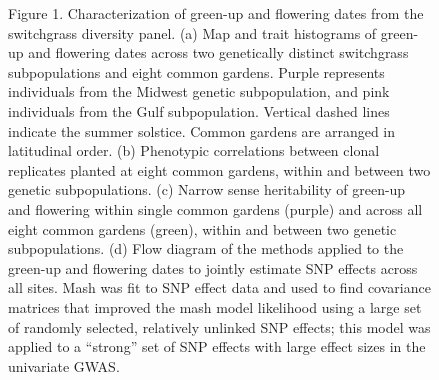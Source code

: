 \documentclass[
  9pt,
  twocolumn,
  twoside]{pnas-new}
\begin{document}
\begin{figure}


\caption{\label{fig-map}Figure 1. Characterization of green-up and
flowering dates from the switchgrass diversity panel. (a) Map and trait
histograms of green-up and flowering dates across two genetically
distinct switchgrass subpopulations and eight common gardens. Purple
represents individuals from the Midwest genetic subpopulation, and pink
individuals from the Gulf subpopulation. Vertical dashed lines indicate
the summer solstice. Common gardens are arranged in latitudinal order.
(b) Phenotypic correlations between clonal replicates planted at eight
common gardens, within and between two genetic subpopulations. (c)
Narrow sense heritability of green-up and flowering within single common
gardens (purple) and across all eight common gardens (green), within and
between two genetic subpopulations. (d) Flow diagram of the methods
applied to the green-up and flowering dates to jointly estimate SNP
effects across all sites. Mash was fit to SNP effect data and used to
find covariance matrices that improved the mash model likelihood using a
large set of randomly selected, relatively unlinked SNP effects; this
model was applied to a ``strong'' set of SNP effects with large effect
sizes in the univariate GWAS.}

\end{figure}%
\end{document}
